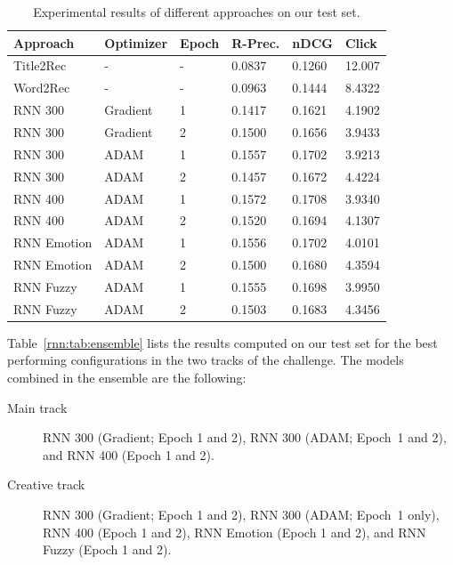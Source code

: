 \begin{table}
\centering
\begin{tabular}{@{}llllll@{}}
\toprule
Approach    & Optimizer & Epoch & R-Prec.     & nDCG   & Click   \\ \midrule
Title2Rec   & -         & -     & 0.0837      & 0.1260 & 12.007  \\
Word2Rec    & -         & -     & 0.0963      & 0.1444 & 8.4322  \\
RNN 300     & Gradient  & 1     & 0.1417      & 0.1621 & 4.1902  \\
RNN 300     & Gradient  & 2     & 0.1500      & 0.1656 & 3.9433  \\
RNN 300     & ADAM      & 1     & 0.1557      & 0.1702 & 3.9213  \\
RNN 300     & ADAM      & 2     & 0.1457      & 0.1672 & 4.4224  \\
RNN 400     & ADAM      & 1     & 0.1572      & 0.1708 & 3.9340  \\
RNN 400     & ADAM      & 2     & 0.1520      & 0.1694 & 4.1307  \\
RNN Emotion & ADAM      & 1     & 0.1556      & 0.1702 & 4.0101  \\
RNN Emotion & ADAM      & 2     & 0.1500      & 0.1680 & 4.3594  \\
RNN Fuzzy   & ADAM      & 1     & 0.1555      & 0.1698 & 3.9950  \\
RNN Fuzzy   & ADAM      & 2     & 0.1503      & 0.1683 & 4.3456  \\ \bottomrule
\end{tabular}
\caption[Results of different approaches]{Experimental results of different approaches on our test set.}
\label{rnn:tab:approaches}
\end{table}

Table~\ref{rnn:tab:ensemble} lists the results computed on our test set for the best performing configurations in the two tracks of the challenge. The models combined in the ensemble are the following:

\begin{description}
\item[Main track] RNN 300 (Gradient; Epoch 1 and 2), RNN 300 (ADAM; Epoch~1 and 2), and RNN 400 (Epoch 1 and 2).
\item[Creative track] RNN 300 (Gradient; Epoch 1 and 2), RNN 300 (ADAM; Epoch~1 only), RNN 400 (Epoch 1 and 2), RNN Emotion (Epoch 1 and 2), and RNN Fuzzy (Epoch 1 and 2).
\end{description}

